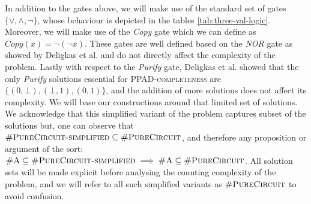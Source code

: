 In addition to the gates above, we will make use of the standard set of gates $\{\vee, \wedge, \neg\}$,
whose behaviour is depicted in the tables \ref{tab:three-val-logic}.
Moreover, we will make use of the \textit{Copy} gate which we can define as $\textit{Copy}(x) = \neg (\neg x)$.
These gates are well defined based on the \textit{NOR} gate as showed by Deligkas et al. \cite{deligkas_PureCircuitTightInapproximability_2024}
and do not directly affect the complexity of the problem.
Lastly with respect to the \textit{Purify} gate,
Deligkas et al. \cite{deligkas_PureCircuitTightInapproximability_2024} showed that the only \textit{Purify} solutions essential
for \textsc{PPAD-completeness} are $\{(0,\bot), (\bot,1), (0,1)\}$, and the addition of more solutions does not affect its complexity.
We will base our constructions around that limited set of solutions.
We acknowledge that this simplified variant of the problem captures subset of the solutions but,
one can observe that $\textsc{\#PureCircuit-simplified} \subseteq \textsc{\#PureCircuit}$,
and therefore any proposition or argument of the sort:
$\textsc{\#A} \subseteq \textsc{\#PureCircuit-simplified} \implies \textsc{\#A} \subseteq \textsc{\#PureCircuit}$.
All solution sets will be made explicit before analysing the counting complexity of the problem,
and we will refer to all such simplified variants as $\textsc{\#PureCircuit}$ to avoid
confusion. 

\begin{table}[h!]
    \centering
 \quad
{}

    \caption{Three-valued logic \cite{kleene_IntroductionMetamathematics_2009}}\label{tab:three-val-logic}
\end{table}

